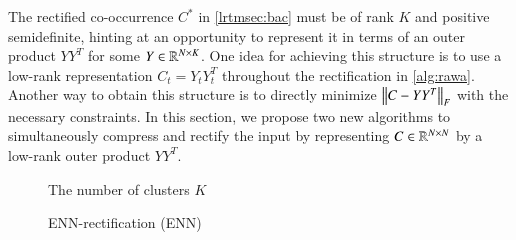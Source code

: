 The rectified co-occurrence $C^*$ in \cref{lrtmsec:bac} must be of rank $K$ and
positive semidefinite, hinting at an opportunity to represent it in terms of an
outer product $Y Y^T$ for some $Y \in \mathbb{R}^{N \mathbin{\times} K}$. One idea for achieving
this structure is to use a low\hyp{}rank representation $C_t = Y_t Y_t^T$
throughout the rectification in \cref{alg:rawa}. Another way to obtain this
structure is to directly minimize $\left\lVert C - Y Y^T\right\rVert_F$ with the necessary
constraints. In this section, we propose two new algorithms to simultaneously
compress and rectify the input by representing $C \in \mathbb{R}^{N \mathbin{\times} N}$ by a
low\hyp{}rank outer product $Y Y^T$.
\begin{figure}[ht]
	\begin{algorithm}[H]
		\DontPrintSemicolon
		\hspace{28px} The number of clusters $K$\\
		\caption{ENN-rectification (ENN)}
	\label{alg:enn}        
	\end{algorithm}
\end{figure}

